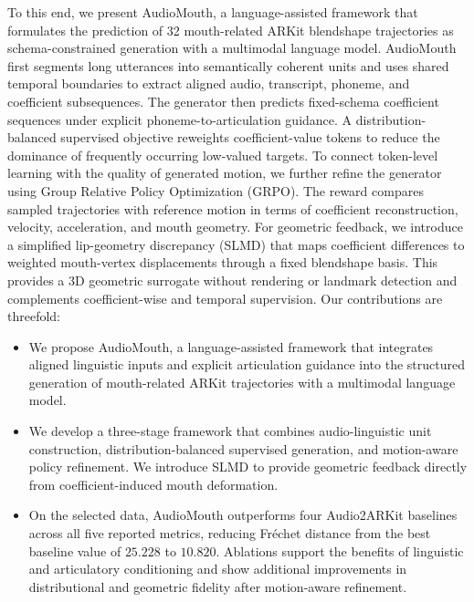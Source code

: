 To this end, we present AudioMouth, a language-assisted framework that formulates the prediction of 32 mouth-related ARKit blendshape trajectories as schema-constrained generation with a multimodal language model.
AudioMouth first segments long utterances into semantically coherent units and uses shared temporal boundaries to extract aligned audio, transcript, phoneme, and coefficient subsequences.
The generator then predicts fixed-schema coefficient sequences under explicit phoneme-to-articulation guidance.
A distribution-balanced supervised objective reweights coefficient-value tokens to reduce the dominance of frequently occurring low-valued targets.
To connect token-level learning with the quality of generated motion, we further refine the generator using Group Relative Policy Optimization (GRPO).
The reward compares sampled trajectories with reference motion in terms of coefficient reconstruction, velocity, acceleration, and mouth geometry.
For geometric feedback, we introduce a simplified lip-geometry discrepancy (SLMD) that maps coefficient differences to weighted mouth-vertex displacements through a fixed blendshape basis.
This provides a 3D geometric surrogate without rendering or landmark detection and complements coefficient-wise and temporal supervision. Our contributions are threefold:
\begin{itemize}
    \item We propose AudioMouth, a language-assisted framework that integrates aligned linguistic inputs and explicit articulation guidance into the structured generation of mouth-related ARKit trajectories with a multimodal language model.

    \item We develop a three-stage framework that combines audio-linguistic unit construction, distribution-balanced supervised generation, and motion-aware policy refinement. We introduce SLMD to provide geometric feedback directly from coefficient-induced mouth deformation.

    \item On the selected data, AudioMouth outperforms four Audio2ARKit baselines across all five reported metrics, reducing Fr\'echet distance from the best baseline value of $25.228$ to $10.820$. Ablations support the benefits of linguistic and articulatory conditioning and show additional improvements in distributional and geometric fidelity after motion-aware refinement.
\end{itemize}
